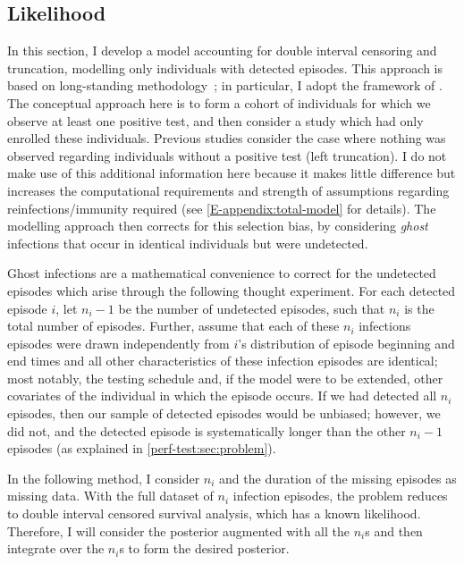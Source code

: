 \documentclass[thesis.tex]{subfiles}
\begin{document}
\subsection{Likelihood}\label{perf-test:sec:likelihood}

In this section, I develop a model accounting for double interval censoring and truncation, modelling only individuals with detected episodes.
This approach is based on long-standing methodology~\autocites{heiseyModelling}{dempsterMaximum}{turnbullEmpirical}; in particular, I adopt the framework of \textcite{heiseyModelling}.
The conceptual approach here is to form a cohort of individuals for which we observe at least one positive test, and then consider a study which had only enrolled these individuals.
Previous studies consider the case where nothing was observed regarding individuals without a positive test (left truncation).
I do not make use of this additional information here because it makes little difference but increases the computational requirements and strength of assumptions regarding reinfections/immunity required (see \cref{E-appendix:total-model} for details).
The modelling approach then corrects for this selection bias, by considering \emph{ghost} infections that occur in identical individuals but were undetected.

Ghost infections are a mathematical convenience to correct for the undetected episodes which arise through the following thought experiment.
For each detected episode $i$, let $n_i-1$ be the number of undetected episodes, such that $n_i$ is the total number of episodes.
Further, assume that each of these $n_i$ infections episodes were drawn independently from $i$'s distribution of episode beginning and end times and all other characteristics of these infection episodes are identical; most notably, the testing schedule and, if the model were to be extended, other covariates of the individual in which the episode occurs.
If we had detected all $n_i$ episodes, then our sample of detected episodes would be unbiased; however, we did not, and the detected episode is systematically longer than the other $n_i-1$ episodes (as explained in \cref{perf-test:sec:problem}).

In the following method, I consider $n_i$ and the duration of the missing episodes as missing data.
With the full dataset of $n_i$ infection episodes, the problem reduces to double interval censored survival analysis, which has a known likelihood.
Therefore, I will consider the posterior augmented with all the $n_i$s and then integrate over the $n_i$s to form the desired posterior.
\end{document}
